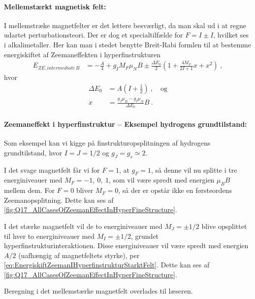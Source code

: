 \paragraph{Mellemstærkt magnetisk felt:} I mellemstræke magnetfelter er det lettere besværligt, da man skal ud i at regne udartet perturbationsteori. Der er dog et specialtilfælde for $F = I \pm I$, hvilket ses i alkalimetaller. Her kan man i stedet benytte Breit-Rabi formlen til at bestemme energiskiftet af Zeemaneffekten i hyperfinstrukturen
\begin{align}
    E_{ZE,intermediate\,B} &= - \frac{A}{4} + g_I M_F \mu_N B \pm \frac{\Delta E_0}{2} \left(1 + \frac{4M_F}{2I+1} x + x^2\right) \: ,
\end{align}
hvor
\begin{align}
    \Delta E_0 &= A\left(I + \frac{1}{2}\right) \: , \quad \text{og} \\
    x &= \frac{g_J \mu_B - g_I \mu_N}{\Delta E_0} B \: .
\end{align}



\paragraph{Zeemaneffekt i hyperfinstruktur -- Eksempel hydrogens grundtilstand:} Som eksempel kan vi kigge på finstrukturopsplitningen af hydrogens grundtilstand, hvor $I = J = 1/2$ og $g_J = g_s \simeq 2$.

I det svage magnetfelt får vi for $F = 1$, at $g_F = 1$, så denne vil nu splitte i tre energiniveauer med $M_F = -1,\: 0,\: 1$, som vil være spredt med energien $\mu_B B$ mellem dem. For $F = 0$ bliver $M_F = 0$, så der er opstår ikke en førsteordens Zeemanopsplitning. Dette kan ses af \cref{fig:Q17_AllCasesOfZeemanEffectInHyperFineStructure}.

I det stærke magnetfelt vil de to energiniveauer med $M_J = \pm 1/2$ blive opsplittet til hver to energiniveauer med $M_I = \pm 1/2$, grundet hyperfinstrukturinteraktionen. Disse energiniveauer vil være spredt med energien $A/2$ (uafhængig af magnetfeltets styrke), per \cref{eq:EnergiskiftZeemanIHyperfinstrukturStarktFelt}. Dette kan ses af \cref{fig:Q17_AllCasesOfZeemanEffectInHyperFineStructure}.

Beregning i det mellemstærke magnetfelt overlades til læseren.

